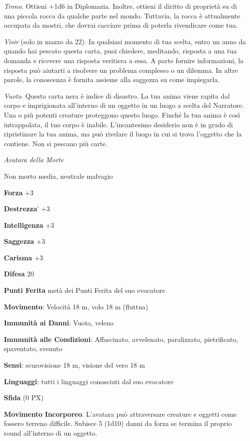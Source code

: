 \begin{multicols}{2}
\textit{Trono}. Ottieni +1d6 in Diplomazia. Inoltre, ottieni il diritto di proprietà su di una piccola rocca da qualche parte nel mondo. Tuttavia, la rocca è attualmente occupata da mostri, che dovrai cacciare prima di poterla rivendicare come tua.

\textit{Visir} (solo in mazzo da 22). In qualsiasi momento di tua scelta, entro un anno da quando hai pescato questa carta, puoi chiedere, meditando, risposta a una tua domanda e ricevere una risposta veritiera a essa. A parte fornire informazioni, la risposta può aiutarti a risolvere un problema complesso o un dilemma. In altre parole, la conoscenza è fornita assieme alla saggezza su come impiegarla.

\textit{Vuoto}. Questa carta nera è indice di disastro. La tua anima viene rapita dal corpo e imprigionata all'interno di un oggetto in un luogo a scelta del Narratore. Una o più potenti creature proteggono questo luogo. Finché la tua anima è così intrappolata, il tuo corpo è inabile. L'incantesimo desiderio non è in grado di ripristinare la tua anima, ma può rivelare il luogo in cui si trova l'oggetto che la contiene. Non si pescano più carte.

\textit{Avatara della Morte}

Non morto media, neutrale malvagio

\textbf{Forza} +3

\textbf{Destrezza}' +3

\textbf{Intelligenza} +3

\textbf{Saggezza} +3

\textbf{Carisma} +3

\textbf{Difesa} 20

\textbf{Punti Ferita} metà dei Punti Ferita del suo evocatore

\textbf{Movimento}: Velocità 18 m, volo 18 m (fluttua)

\textbf{Immunità ai Danni}: Vuoto, veleno

\textbf{Immunità alle Condizioni}: Affascinato, avvelenato, paralizzato, pietrificato, spaventato, svenuto

\textbf{Sensi}: scurovisione 18 m, visione del vero 18 m

\textbf{Linguaggi}: tutti i linguaggi conosciuti dal suo evocatore

\textbf{Sfida} (0 PX)

\textbf{Movimento Incorporeo}. L'avatara può attraversare creature e oggetti come fossero terreno difficile. Subisce 5 (1d10) danni da forza se termina il proprio round all'interno di un oggetto.


\end{multicols}
